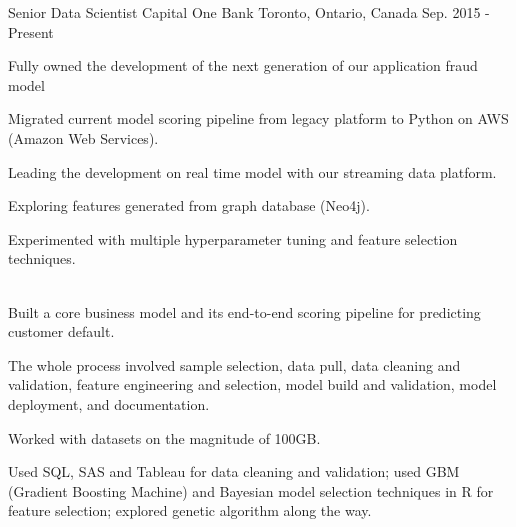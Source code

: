 

\begin{cventries}

  \cventry
    {Senior Data Scientist} %
    {Capital One Bank} %
    {Toronto, Ontario, Canada} %
    {Sep. 2015 - Present} %
    {
      \begin{cvitems} %
        \item {Fully owned the development of the next generation of our application fraud model}\\
        \begin{cvitems}
          \item {Migrated current model scoring pipeline from legacy platform to Python on AWS (Amazon Web Services).}
          \item {Leading the development on real time model with our streaming data platform.}
          \item {Exploring features generated from graph database (Neo4j).}
          \item {Experimented with multiple hyperparameter tuning and feature selection techniques.}\\\\
        \end{cvitems}
        \item {Built a core business model and its end-to-end scoring pipeline for predicting customer default.}\\
        \begin{cvitems}
          \item {The whole process involved sample selection, data pull, data cleaning and validation, feature engineering and selection, model build and validation, model deployment, and documentation.}
          \item {Worked with datasets on the magnitude of 100GB.}
          \item {Used SQL, SAS and Tableau for data cleaning and validation; used GBM (Gradient Boosting Machine) and Bayesian model selection techniques in R for feature selection; explored genetic algorithm along the way.}

\end{cvitems}
\end{cvitems}}
\end{cventries}
